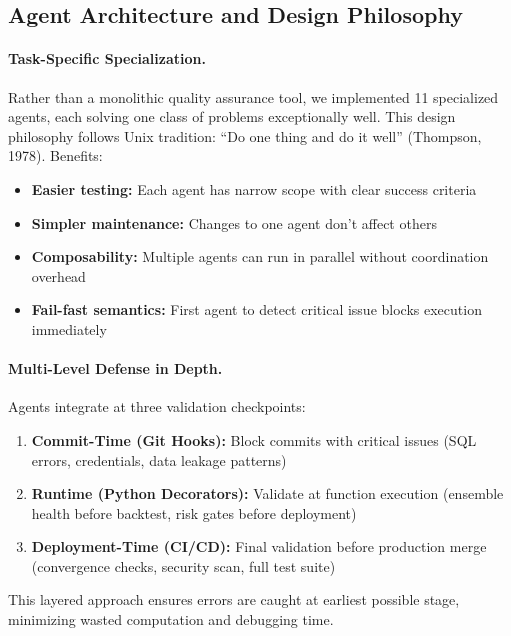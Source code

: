 \subsection{Agent Architecture and Design Philosophy}

\paragraph{Task-Specific Specialization.}
Rather than a monolithic quality assurance tool, we implemented 11 specialized agents, each solving one class of problems exceptionally well. This design philosophy follows Unix tradition: ``Do one thing and do it well'' (Thompson, 1978). Benefits:

\begin{itemize}[itemsep=2pt,parsep=0pt]
    \item \textbf{Easier testing:} Each agent has narrow scope with clear success criteria
    \item \textbf{Simpler maintenance:} Changes to one agent don't affect others
    \item \textbf{Composability:} Multiple agents can run in parallel without coordination overhead
    \item \textbf{Fail-fast semantics:} First agent to detect critical issue blocks execution immediately
\end{itemize}

\paragraph{Multi-Level Defense in Depth.}
Agents integrate at three validation checkpoints:

\begin{enumerate}[itemsep=2pt,parsep=0pt]
    \item \textbf{Commit-Time (Git Hooks):} Block commits with critical issues (SQL errors, credentials, data leakage patterns)
    \item \textbf{Runtime (Python Decorators):} Validate at function execution (ensemble health before backtest, risk gates before deployment)
    \item \textbf{Deployment-Time (CI/CD):} Final validation before production merge (convergence checks, security scan, full test suite)
\end{enumerate}

This layered approach ensures errors are caught at earliest possible stage, minimizing wasted computation and debugging time.

